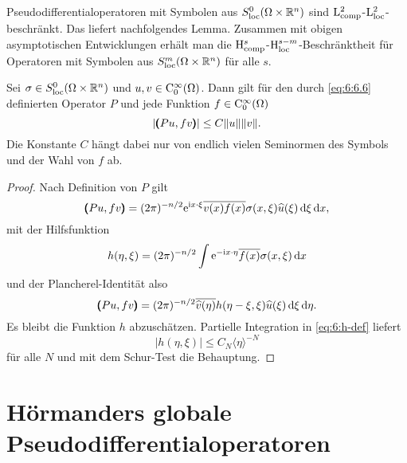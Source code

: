 Pseudodifferentialoperatoren mit Symbolen aus $S^0_{\rm loc}(\Omega\times\mathbb R^n)$ sind $\mathrm L^2_{\rm comp}$-$\mathrm L^2_{\rm loc}$-beschränkt. Das liefert nachfolgendes Lemma. Zusammen mit obigen asymptotischen Entwicklungen erhält man die $\mathrm H^s_{\rm comp}$-$\mathrm H^{s-m}_{\rm loc}$-Beschränktheit für Operatoren mit Symbolen aus $S^m_{\rm loc}(\Omega\times\mathbb R^n)$ für alle $s$.
\begin{lem}
Sei $\sigma\in S^0_{\rm loc}(\Omega\times\mathbb R^n)$ und $u,v\in\mathrm C_0^\infty(\Omega)$. Dann gilt für den durch \eqref{eq:6:6.6} definierten Operator $P$
und jede Funktion $f\in\mathrm C_0^\infty(\Omega)$
\begin{equation}
   | \pmb(Pu,f v\pmb) | \le C \|u\|\|v\|.
\end{equation}
Die Konstante $C$ hängt dabei nur von endlich vielen Seminormen des Symbols und der Wahl von $f$ ab.
\end{lem}
\begin{proof}
Nach Definition von $P$ gilt
\begin{equation}
   \pmb(Pu,fv\pmb) = (2\pi)^{-n/2} \relax \mathrm e^{\mathrm i x\cdot \xi}\overline{ v(x) f(x)} \sigma(x,\xi) \widehat u(\xi)\,\mathrm d\xi\,\mathrm d x,
\end{equation}
mit der Hilfsfunktion
\begin{equation}\label{eq:6:h-def}
  h(\eta,\xi) =  (2\pi)^{-n/2} \int \mathrm e^{-\mathrm i x\cdot\eta} \overline{f(x)} \sigma(x,\xi) \,\mathrm d x
\end{equation}
und der Plancherel-Identität also
\begin{equation}
   \pmb(Pu,fv\pmb) = (2\pi)^{-n/2} \relax \overline{ \widehat v(\eta) }h(\eta-\xi,\xi) \widehat u(\xi)\,\mathrm d\xi\,\mathrm d\eta.
\end{equation}
Es bleibt die Funktion $h$ abzuschätzen. Partielle Integration in \eqref{eq:6:h-def} liefert
\begin{equation}
   |h(\eta,\xi)|  \le C_N \langle\eta\rangle^{-N}
\end{equation}
für alle $N$ und mit dem Schur-Test die Behauptung.
\end{proof}

\section{Hörmanders globale Pseudodifferentialoperatoren}


